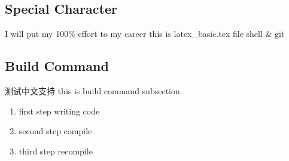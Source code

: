 \documentclass[UTF8]{ctexart}
\begin{document}
\subsection{Special Character}
I will put my 100\% effort to my career
this is latex\_basic.tex file
shell \& git

\subsection{Build Command}
测试中文支持
this is build command subsection
		\begin{enumerate}
			\item first step writing code
			\item second step compile
			\item third step recompile
		\end{enumerate}
\end{document}
